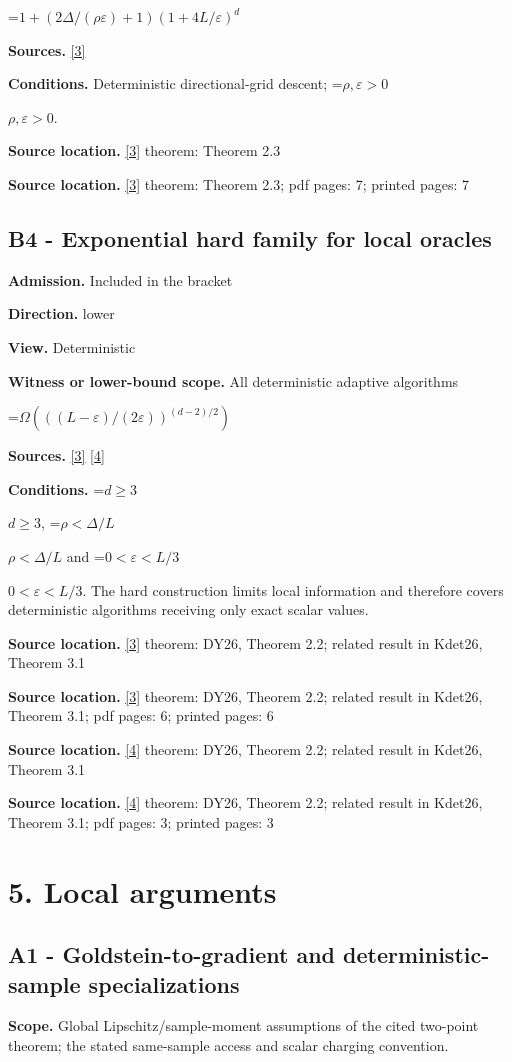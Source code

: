 \documentclass[10pt,a4paper]{article}
\newcommand{\AtlasMath}[1]{\par\begingroup\centering\setbox0=\hbox{$\displaystyle #1$}\ifdim\wd0>1.4\linewidth\typeout{ATLAS WIDE FORMULA: \the\wd0}\fi\ifdim\wd0>\linewidth\resizebox{\linewidth}{!}{\box0}\else\box0\fi\par\endgroup}
\newcommand{\AtlasInlineMath}[1]{\begingroup\setbox0=\hbox{$#1$}\ifdim\wd0>.4\linewidth\endgroup\AtlasMath{#1}\else\endgroup$#1$\fi}
\begin{document}
\AtlasMath{1+(2\Delta/(\rho\varepsilon)+1)(1+4L/\varepsilon)^d}
\textbf{Sources.} \href{https://arxiv.org/html/2609.38082v1}{[3]}

\textbf{Conditions.} Deterministic directional-grid descent; \AtlasInlineMath{\rho,\varepsilon>0}.

\textbf{Source location.} \href{https://arxiv.org/html/2609.38082v1}{[3]} theorem: Theorem 2.3

\textbf{Source location.} \href{https://arxiv.org/html/2609.38082v1}{[3]} theorem: Theorem 2.3; pdf pages: 7; printed pages: 7

\subsection{B4 - Exponential hard family for local oracles}
\textbf{Admission.} Included in the bracket

\textbf{Direction.} lower

\textbf{View.} Deterministic

\textbf{Witness or lower-bound scope.} All deterministic adaptive algorithms

\AtlasMath{\Omega\!\left(((L-\varepsilon)/(2\varepsilon))^{(d-2)/2}\right)}
\textbf{Sources.} \href{https://arxiv.org/html/2609.38082v1}{[3]} \href{https://arxiv.org/html/2609.23837v1}{[4]}

\textbf{Conditions.} \AtlasInlineMath{d\ge3}, \AtlasInlineMath{\rho<\Delta/L} and \AtlasInlineMath{0<\varepsilon<L/3}. The hard construction limits local information and therefore covers deterministic algorithms receiving only exact scalar values.

\textbf{Source location.} \href{https://arxiv.org/html/2609.38082v1}{[3]} theorem: DY26, Theorem 2.2; related result in Kdet26, Theorem 3.1

\textbf{Source location.} \href{https://arxiv.org/html/2609.38082v1}{[3]} theorem: DY26, Theorem 2.2; related result in Kdet26, Theorem 3.1; pdf pages: 6; printed pages: 6

\textbf{Source location.} \href{https://arxiv.org/html/2609.23837v1}{[4]} theorem: DY26, Theorem 2.2; related result in Kdet26, Theorem 3.1

\textbf{Source location.} \href{https://arxiv.org/html/2609.23837v1}{[4]} theorem: DY26, Theorem 2.2; related result in Kdet26, Theorem 3.1; pdf pages: 3; printed pages: 3

\section{5. Local arguments}
\subsection{A1 - Goldstein-to-gradient and deterministic-sample specializations}
\textbf{Scope.} Global Lipschitz/sample-moment assumptions of the cited two-point theorem; the stated same-sample access and scalar charging convention.
\end{document}
